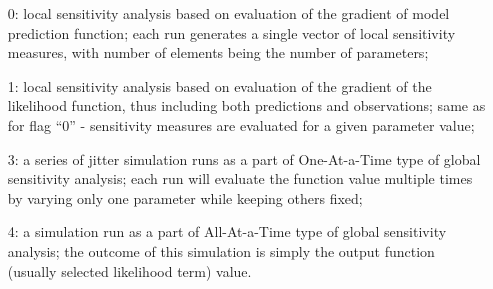 \begin{itemize}
\item[0:] local sensitivity analysis based on evaluation of the gradient of model prediction function; each run generates a single vector of local sensitivity measures, with number of elements being the number of parameters;
\item[1:] local sensitivity analysis based on evaluation of the gradient of the likelihood function, thus including both predictions and observations; same as for flag ``0'' - sensitivity measures are evaluated for a given parameter value;
\item[3:] a series of jitter simulation runs as a part of One-At-a-Time type of global sensitivity analysis; each run will evaluate the function value multiple times by varying only one parameter while keeping others fixed;
\item[4:] a simulation run as a part of All-At-a-Time type of global sensitivity analysis; the outcome of this simulation is simply the output function (usually selected likelihood term) value.
\end{itemize}


